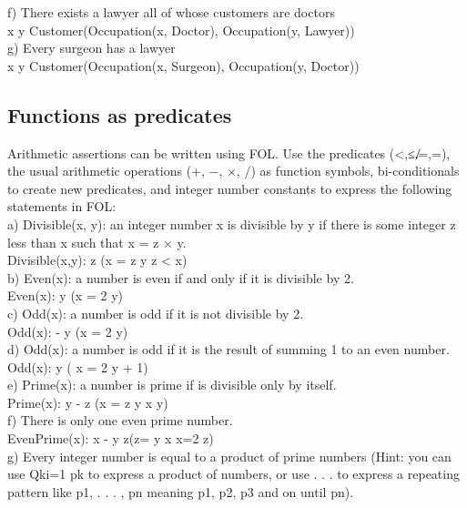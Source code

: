 \documentclass{article}
\begin{document}
f) There exists a lawyer all of whose customers are doctors\\
\exists x \forall y \: Customer(Occupation(x, Doctor), Occupation(y, Lawyer))\\

g) Every surgeon has a lawyer\\
\forall x \exists y \: Customer(Occupation(x, Surgeon), Occupation(y, Doctor))\\


\subsection{Functions as predicates}

Arithmetic assertions can be written using FOL. Use the predicates (<,≤,̸=,=), the usual arithmetic operations (+, −, ×, /) as function symbols, bi-conditionals to create new predicates, and integer number constants to express the following statements in FOL:\\

a) Divisible(x, y): an integer number x is divisible by y if there is some integer z less than x such that x = z × y.\\
Divisible(x,y): \exists z (x = z \times y \wedge z < x)\\

b) Even(x): a number is even if and only if it is divisible by 2.\\
Even(x): \exists y (x = 2 \times y)\\

c) Odd(x): a number is odd if it is not divisible by 2.\\
Odd(x): - \exists y (x = 2 \times y)\\

d) Odd(x): a number is odd if it is the result of summing 1 to an even number.\\
Odd(x): \exists y ( x = 2 \times y + 1)\\

e) Prime(x): a number is prime if is divisible only by itself.\\
Prime(x): \forall y - \exists z (x = z \times y \wedge x \neq y)\\

f) There is only one even prime number.\\
EvenPrime(x): \forall x - \exists y \exists z(z= \wedge y \neq x \wedge x=2 \times z) \\

g) Every integer number is equal to a product of prime numbers (Hint: you can use Qki=1 pk to express a product of numbers, or use . . . to express a repeating pattern like p1, . . . , pn meaning p1, p2, p3 and on until pn).\\
\end{document}
